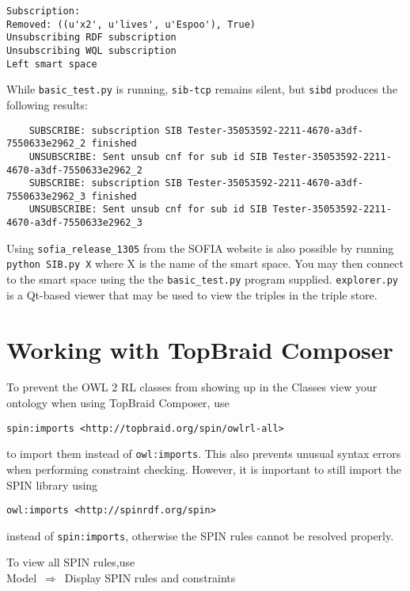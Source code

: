 \begin{verbatim}
Subscription:
Removed: ((u'x2', u'lives', u'Espoo'), True)
Unsubscribing RDF subscription
Unsubscribing WQL subscription
Left smart space
\end{verbatim}

While \texttt{basic\_test.py} is running, \texttt{sib-tcp} remains silent, but \texttt{sibd} produces the following results:

\begin{verbatim}
	SUBSCRIBE: subscription SIB Tester-35053592-2211-4670-a3df-7550633e2962_2 finished
	UNSUBSCRIBE: Sent unsub cnf for sub id SIB Tester-35053592-2211-4670-a3df-7550633e2962_2
	SUBSCRIBE: subscription SIB Tester-35053592-2211-4670-a3df-7550633e2962_3 finished
	UNSUBSCRIBE: Sent unsub cnf for sub id SIB Tester-35053592-2211-4670-a3df-7550633e2962_3
\end{verbatim}

Using \texttt{sofia\_release\_1305} from the SOFIA website is also possible by running \verb|python SIB.py X| where X is the name of the smart space. You may then connect to the smart space using the the \texttt{basic\_test.py} program supplied.
\texttt{explorer.py} is a Qt-based viewer that may be used to view the triples in the triple store.


\section{Working with TopBraid Composer}

To prevent the OWL 2 RL classes from showing up in the Classes view your ontology when using TopBraid Composer, use 

\begin{verbatim}
spin:imports <http://topbraid.org/spin/owlrl-all>
\end{verbatim}

to import them instead of \texttt{owl:imports}. This also prevents unusual syntax errors when performing constraint checking. However, it is important to still import the SPIN library using 

\begin{verbatim}
owl:imports <http://spinrdf.org/spin>
\end{verbatim}

instead of \texttt{spin:imports}, otherwise the SPIN rules cannot be resolved properly.

To view all SPIN rules,use\\

Model~$\Rightarrow$~Display SPIN rules and constraints



